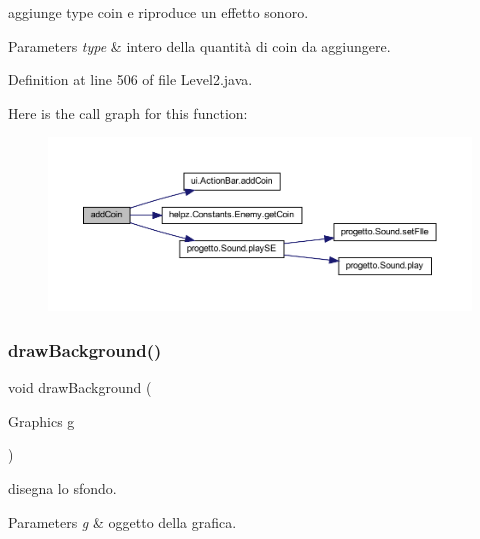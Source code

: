 aggiunge \textquotesingle{}type\textquotesingle{} coin e riproduce un effetto sonoro. 


\begin{DoxyParams}{Parameters}
{\em type} & intero della quantità di coin da aggiungere. \\
\hline
\end{DoxyParams}


Definition at line 506 of file Level2.\+java.

Here is the call graph for this function\+:\nopagebreak
\begin{figure}[H]
\begin{center}
\leavevmode
\includegraphics[width=350pt]{classscenes_1_1_level2_a9f0f7dc28e596d2ebcd06e27ef05d9fd_cgraph}
\end{center}
\end{figure}
\mbox{\label{classscenes_1_1_level2_a62bcb07be9e39896e5837a9d396e7235}} 
\subsubsection{\texorpdfstring{draw\+Background()}{drawBackground()}}
{\footnotesize\ttfamily void draw\+Background (\begin{DoxyParamCaption}\item[{Graphics}]{g }\end{DoxyParamCaption})\hspace{0.3cm}{\ttfamily [private]}}



disegna lo sfondo. 


\begin{DoxyParams}{Parameters}
{\em g} & oggetto della grafica. \\
\hline
\end{DoxyParams}


